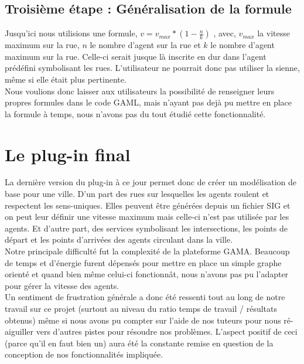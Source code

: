 \documentclass[11pt]{report} %
\begin{document}
\section{Troisi\`eme \'etape : G\'en\'eralisation de la formule}
Jusqu'ici nous utilisions une formule, $v = v_{max} *  ( 1 -\frac{n}{k})$ , avec, $v_{max}$ la vitesse maximum sur la rue, $n$ le nombre d'agent sur la rue et $k$ le nombre d'agent maximum sur la rue. Celle-ci serait jusque l\`a inscrite en dur dans l'agent pr\'ed\'efini symbolisant les rues. L'utilisateur ne pourrait donc pas utiliser la sienne, m\^eme si elle \'etait plus pertinente.\\
Nous voulions donc laisser aux utilisateurs la possibilit\'e de renseigner leurs propres formules dans le code GAML, mais n'ayant pas dej\`a pu mettre en place la formule \`a temps, nous n'avons pas du tout \'etudi\'e cette fonctionnalit\'e.

\chapter{Le plug-in final}
La derni\`ere version du plug-in \`a ce jour permet donc de cr\'eer un mod\'elisation de base pour une ville. D'un part des rues sur lesquelles les agents roulent et respectent les sens-uniques. Elles peuvent \^etre g\'en\'er\'ees depuis un fichier SIG et on peut leur d\'efinir une vitesse maximum mais celle-ci n'est pas utilis\'ee par les agents. Et d'autre part, des services symbolisant les intersections, les points de d\'epart et les points d'arriv\'ees des agents circulant dans la ville.\\
Notre principale difficult\'e fut la complexit\'e de la plateforme GAMA. Beaucoup de temps et d'\'energie furent d\'epens\'es pour mettre en place un simple graphe orient\'e et quand bien m\^eme celui-ci fonctionnât, nous n'avons pas pu l'adapter pour g\'erer la vitesse des agents.\\
Un sentiment de frustration g\'en\'erale a donc \'et\'e ressenti tout au long de notre travail sur ce projet (surtout au niveau du ratio temps de travail / r\'esultats obtenus)  m\^eme si nous avons pu compter sur l'aide de nos tuteurs pour nous r\'e-aiguiller vers d'autres pistes pour r\'esoudre nos probl\`emes. L'aspect positif de ceci (parce qu'il en faut bien un) aura \'et\'e la constante remise en question de la conception de nos fonctionnalit\'es impliqu\'ee.
\end{document}
